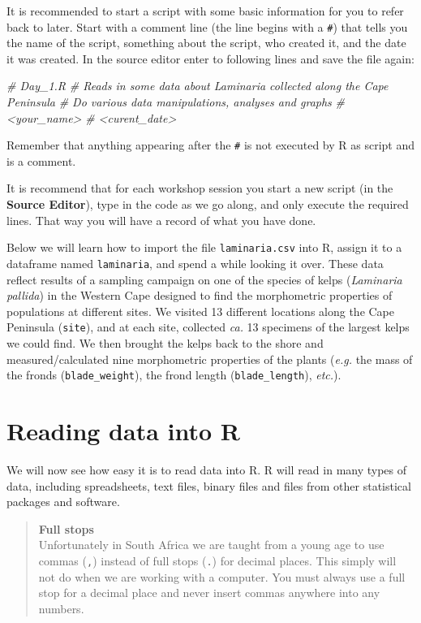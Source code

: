 \documentclass[]{book}
\newenvironment{Shaded}{\begin{snugshade}}{\end{snugshade}}
\newcommand{\CommentTok}[1]{\textcolor[rgb]{0.56,0.35,0.01}{\textit{#1}}}
\theoremstyle{definition}
\theoremstyle{definition}
\theoremstyle{definition}
\theoremstyle{remark}
\begin{document}
It is recommended to start a script with some basic information for you
to refer back to later. Start with a comment line (the line begins with
a \texttt{\#}) that tells you the name of the script, something about
the script, who created it, and the date it was created. In the source
editor enter to following lines and save the file again:

\begin{Shaded}
\begin{Highlighting}[]
\CommentTok{# Day_1.R}
\CommentTok{# Reads in some data about Laminaria collected along the Cape Peninsula}
\CommentTok{# Do various data manipulations, analyses and graphs}
\CommentTok{# <your_name>}
\CommentTok{# <curent_date>}
\end{Highlighting}
\end{Shaded}

Remember that anything appearing after the \texttt{\#} is not executed
by R as script and is a comment.

It is recommend that for each workshop session you start a new script
(in the \textbf{Source Editor}), type in the code as we go along, and
only execute the required lines. That way you will have a record of what
you have done.

Below we will learn how to import the file \texttt{laminaria.csv} into
R, assign it to a dataframe named \texttt{laminaria}, and spend a while
looking it over. These data reflect results of a sampling campaign on
one of the species of kelps (\emph{Laminaria pallida}) in the Western
Cape designed to find the morphometric properties of populations at
different sites. We visited 13 different locations along the Cape
Peninsula (\texttt{site}), and at each site, collected \emph{ca.} 13
specimens of the largest kelps we could find. We then brought the kelps
back to the shore and measured/calculated nine morphometric properties
of the plants (\emph{e.g.} the mass of the fronds
(\texttt{blade\_weight}), the frond length (\texttt{blade\_length}),
\emph{etc.}).

\section{Reading data into R}\label{reading-data-into-r}

We will now see how easy it is to read data into R. R will read in many
types of data, including spreadsheets, text files, binary files and
files from other statistical packages and software.

\begin{quote}
\textbf{Full stops}\\
Unfortunately in South Africa we are taught from a young age to use
commas (\texttt{,}) instead of full stops (\texttt{.}) for decimal
places. This simply will not do when we are working with a computer. You
must always use a full stop for a decimal place and never insert commas
anywhere into any numbers.
\end{quote}
\end{document}

